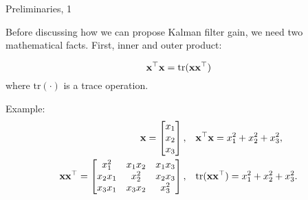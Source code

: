 \documentclass{beamer}
\begin{document}
\begin{frame}{Preliminaries, 1}
	\begin{flushleft}
		
		Before discussing how we can propose Kalman filter gain, we need two mathematical facts. First, inner and outer product:
		
		\begin{equation}
			\mathbf{x}^\top \mathbf{x} = \text{tr}(\mathbf{x}\mathbf{x}^\top)
		\end{equation}
		where $\text{tr}(\cdot)$ is a trace operation.
	
	\bigskip
	
		Example:
		\begin{align*}
			\bo{x} = 
			\begin{bmatrix}
				x_1 \\ x_2 \\ x_3
			\end{bmatrix},& 
		\ \ \ 
		\bo{x}\T \bo{x} = x_1^2+x_2^2+x_3^2, 
		\\
		\bo{x}\bo{x}\T = 
		\begin{bmatrix}
			x_1^2    & x_1 x_2 & x_1 x_3 \\ 
			x_2 x_1 & x_2^2    & x_2 x_3 \\ 
			x_3 x_1 & x_3 x_2 & x_3^2
		\end{bmatrix},& 
	\ \ \
	\text{tr}(\bo{x}\bo{x}\T)  = x_1^2+x_2^2+x_3^2.
		\end{align*}	
	
	\end{flushleft}
\end{frame}
\end{document}
